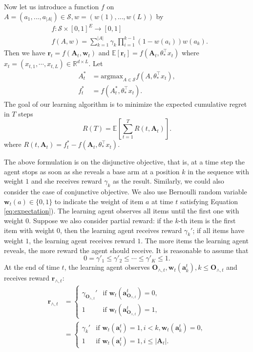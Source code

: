 \documentclass{article}
\newcommand{\EE}{\mathbb{E}}
\newcommand{\RR}{\mathbb{R}}
\newcommand{\bA}{\mathbf{A}}
\newcommand{\ba}{\mathbf{a}}
\newcommand{\bO}{\mathbf{O}}
\newcommand{\br}{\mathbf{r}}
\newcommand{\bw}{\mathbf{w}}
\newcommand{\cS}{\mathcal{S}}
\newcommand{\argmax}{\mathrm{argmax}}
\newcommand{\abs}[1]{\left| #1 \right|}
\begin{document}
Now let us introduce a function $f$ on $A = (a_1,...,a_{\abs{A}}) \in \cS, w = (w(1),...,w(L))$ by
\begin{align}
&f : \cS \times [0,1]^E \to [0,1] \nonumber \\
&f(A,w) = \sum_{k = 1}^{\abs{A}} \gamma_{k} \prod_{i=1}^{k-1} (1 - w(a_i)) w(a_k).
	\label{eq:functionf}
\end{align}
Then we have $\br_t = f(\bA_t, \bw_t)$ and $\EE[\br_t] = f(\bA_t, \theta_{\ast}^{\top}x_t)$ where $x_t = (x_{t,1}, \cdots, x_{t,L}) \in \RR^{d \times L}$. Let 
\begin{align*}
A_t^{\ast} &= \argmax_{A\in \cS} f(A,\theta_{\ast}^{\top}x_t),\\
f_t^{\ast} &= f(A_t^{\ast}, \theta_{\ast}^{\top}x_t).
\end{align*}
The goal of our learning algorithm is to minimize the expected cumulative regret in $T$ steps
$$
R(T) = \EE\left[\sum_{t=1}^T R(t, \bA_t)\right].
$$
where $R(t, \bA_t) = f_t^{\ast} - f(\bA_t, \theta_{\ast}^{\top}x_t)$.

The above formulation is on the disjunctive objective, that is, at a time step the agent stops as soon as she reveals a base arm at a position $k$ in the sequence with weight $1$ and she receives reward $\gamma_k$ as the result. Similarly, we could also consider the case of conjunctive objective. We also use Bernoulli random variable $\bw_{t}(a) \in \{0,1\}$ to indicate the weight of item $a$ at time $t$ satisfying Equation \eqref{eq:expectation}). The learning agent observes all items until the first one with weight $0$. Suppose we also consider partial reward: if the $k$-th item is the first item with weight $0$, then the learning agent receives reward $\gamma_k'$; if all items have weight $1$, the learning agent receives reward $1$. The more items the learning agent reveals, the more reward the agent should receive. It is reasonable to assume that
$$
0 = \gamma'_1 \leq \gamma'_2 \leq \cdots \leq \gamma'_K \leq 1.
$$
At the end of time $t$, the learning agent observes $\bO_{\wedge, t}, \bw_t(\ba_k^t), k \leq \bO_{\wedge, t}$ and receives reward
	$\br_{\wedge, t}$:
\begin{align*}
\br_{\wedge, t} &= \begin{cases}
\gamma_{\bO_{\wedge, t}}'  &\text{if } \bw_t(\ba_{\bO_{\wedge, t}}^t) = 0,\\
1 &\text{if } \bw_t(\ba_{\bO_{\wedge, t}}^t) = 1,
\end{cases}\\
&=\begin{cases}
\gamma_{k}'  &\text{if } \bw_t(\ba_{i}^t) = 1, i < k, \bw_t(\ba_{k}^t) = 0,\\
1 &\text{if } \bw_t(\ba_{i}^t) = 1, i\leq \abs{\bA_t}.
\end{cases}
\end{align*}
\end{document}
